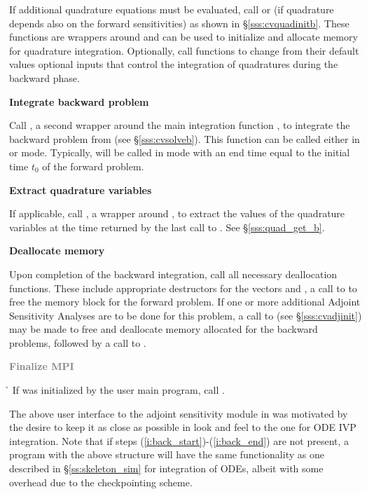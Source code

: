 \begin{Steps}
  If additional quadrature equations must be evaluated, 
  call  or  (if quadrature depends also on the
  forward sensitivities) as shown in \S\ref{sss:cvquadinitb}. These functions are
  wrappers around  and can be used to initialize and allocate 
  memory for quadrature integration. Optionally, call  functions 
  to change from their default values optional inputs that control the integration 
  of quadratures during the backward phase.

\item
  {\bf Integrate backward problem}

  Call , a second wrapper around the {\cvodes} main integration
  function , to integrate the backward problem from 
  (see \S\ref{sss:cvsolveb}). This function can be called either in 
  or  mode. Typically,  will be called in 
  mode with an end time equal to the initial time $t_0$ of the forward problem.

\item \label{i:back_end}
  {\bf Extract quadrature variables}

  If applicable, call , a wrapper around ,
  to extract the values of the quadrature variables at the time returned
  by the last call to . See \S\ref{sss:quad_get_b}.

\item
  {\bf Deallocate memory}

  Upon completion of the backward integration, call all necessary deallocation
  functions. These include appropriate destructors for the vectors 
   and , a call to  to free the {\cvodes} memory block 
  for the forward problem.  If one or more additional Adjoint
  Sensitivity Analyses are
  to be done for this problem, a call to  (see \S\ref{sss:cvadjinit})
  may be made to free and deallocate memory allocated for the backward problems, 
  followed by a call to .

\item
  \textcolor{gray}{\bf Finalize MPI}

  {\p} {\h} If {\mpi} was initialized by the user main program, call .

\end{Steps}

The above user interface to the adjoint sensitivity module in {\cvodes} was motivated by
the desire to keep it as close as possible in look and feel to the one for ODE IVP 
integration. Note that if steps (\ref{i:back_start})-(\ref{i:back_end}) are not present, 
a program with the above structure will have the same functionality as one described in
\S\ref{ss:skeleton_sim} for integration of ODEs, albeit with some overhead due to 
the checkpointing scheme.

